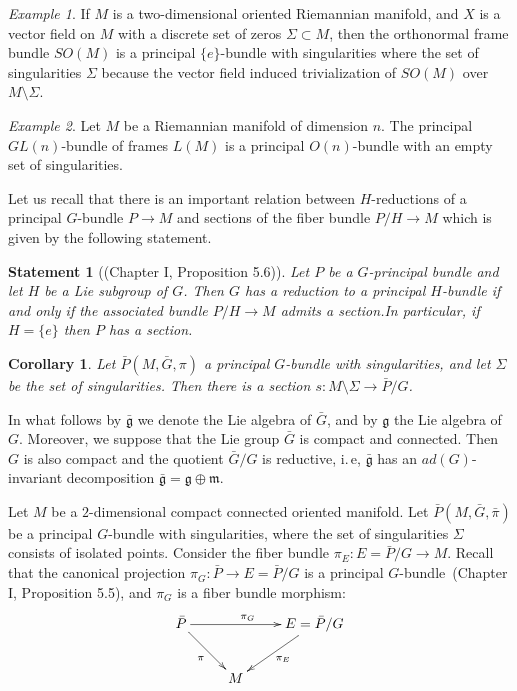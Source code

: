 \documentclass[12pt,letterpaper]{amsart}
\theoremstyle{definition}
\theoremstyle{plain}
\newtheorem{stat}{Statement}
\newtheorem{cor}{Corollary}
\theoremstyle{remark}
\newtheorem{ex}{Example}
\begin{document}
\begin{ex}
If $M$ is a two-dimensional oriented Riemannian manifold, and $X$ is a vector field on $M$ with a discrete set of zeros $\Sigma \subset M$, then the orthonormal frame bundle $SO(M)$ is a principal $\{e\}$-bundle with singularities where the set of singularities $\Sigma$ because the vector field induced trivialization of $SO(M)$ over $M \setminus \Sigma$.
\label{ex:8}
\end{ex}
\begin{ex}
Let $M$ be a Riemannian manifold of dimension $n$. The principal $GL(n)$-bundle of frames $L(M)$ is a principal $O(n)$-bundle with an empty set of singularities.
\label{ex:9}
\end{ex}
Let us recall that there is an important relation between $H$-reductions of a principal $G$-bundle $P \to M$ and sections of the fiber bundle $P/H \to M$ which is given by the following statement.
\begin{stat}[\cite{kobayashi_nomizu1963}(Chapter I, Proposition 5.6)]
Let $P$ be a $G$-principal bundle and let $H$ be a Lie subgroup of $G$.
Then $G$ has a reduction to a principal $H$-bundle if and only if the associated bundle $P/H\rightarrow M$ admits a section.In particular, if $H=\{e\}$ then $P$ has a section.
\label{stat:10}
\end{stat}
\begin{cor}
Let $\bar{P}(M, \bar{G}, \pi)$ a principal $G$-bundle with singularities, and let $\Sigma$ be the set of singularities.
Then there is a section $s: M\setminus \Sigma \rightarrow \bar{P}/G$.
\label{cor:4}
\end{cor}

In what follows by $\mathfrak{\bar{g}}$ we denote the Lie algebra of $\bar{G}$, and by $\mathfrak{g}$ the Lie algebra of $G$.
Moreover, we suppose that the Lie group $\bar{G}$ is compact and connected.
Then $G$ is also compact and the quotient $\bar{G}/G$ is reductive, i.\,e, $\mathfrak{\bar{g}}$ has an $ad(G)$-invariant decomposition $\bar{\mathfrak{g}}=\mathfrak{g}\oplus \mathfrak{m}$.


Let $M$ be a $2$-dimensional compact connected oriented manifold.
Let $\bar{P}(M, \bar{G}, \bar{\pi})$ be a principal $G$-bundle with singularities, where the set of singularities $\Sigma$ consists of isolated points.
Consider the fiber bundle $\pi_E: E = \bar{P}/G \rightarrow M$.
Recall that the canonical projection $\pi_G: \bar{P}\rightarrow E=\bar{P}/G$ is a principal $G$-bundle~\cite{kobayashi_nomizu1963}(Chapter I, Proposition 5.5), and $\pi_G$ is a fiber bundle morphism: 
\begin{equation}
\xymatrix{%
\bar{P} \ar[rr]^{\pi_G} \ar[rd]_{\pi} & & E = \bar{P}/G \ar[ld]^{\pi_E}
\\
&M &%
}
\label{eq:74}
\end{equation}
\end{document}
